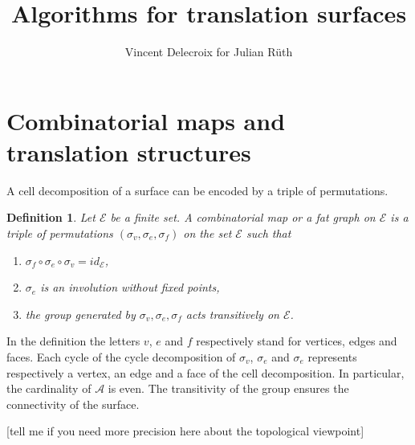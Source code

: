 \documentclass{article}
\title{Algorithms for translation surfaces}
\author{Vincent Delecroix for Julian R\"uth}
\def\cA{\mathcal{A}}
\def\cE{\mathcal{E}}
\newtheorem{definition}{Definition}
\newcommand{\commv}[1]{{\color{red!50!gray}[#1]}}
\begin{document}
\maketitle

\section{Combinatorial maps and translation structures}
\label{sec:TriangulationsAndTranslationStructures}

A cell decomposition of a surface can be encoded by a triple of
permutations.
\begin{definition}
Let $\cE$ be a finite set.
A \emph{combinatorial map} or a \emph{fat graph} on $\cE$ is a triple
of permutations $(\sigma_v, \sigma_e, \sigma_f)$ on
the set $\cE$ such that
\begin{enumerate}
\item $\sigma_f \circ \sigma_e \circ \sigma_v = id_\cE$,
\item $\sigma_e$ is an involution without fixed points,
\item the group generated by $\sigma_v, \sigma_e, \sigma_f$ acts transitively on $\cE$.
\end{enumerate}
\end{definition}
In the definition the letters  $v$, $e$ and $f$ respectively stand for vertices, edges
and faces.  Each cycle of the cycle decomposition of $\sigma_v$, $\sigma_e$
and $\sigma_e$ represents respectively a vertex, an edge
and a face of the cell decomposition. In particular, the cardinality of $\cA$
is even. The transitivity of the group ensures the connectivity of the surface.

\commv{tell me if you need more precision here about the topological viewpoint}
\end{document}
